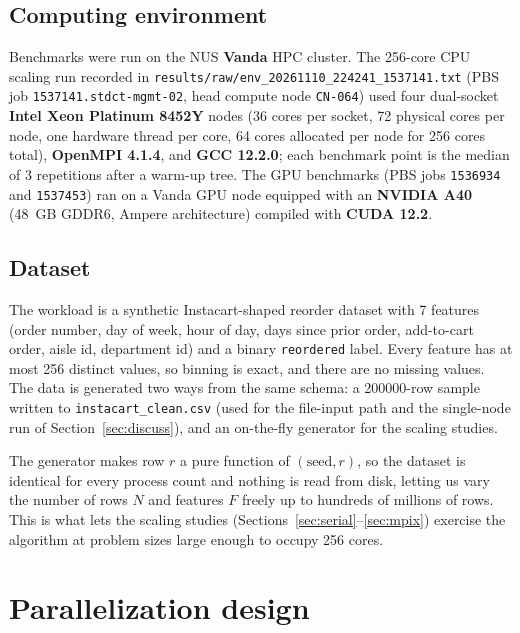 \documentclass[11pt]{article}
\begin{document}
\subsection{Computing environment}

Benchmarks were run on the NUS \textbf{Vanda} HPC cluster. The \num{256}-core CPU scaling run recorded in \texttt{results/raw/env\_20261110\_224241\_1537141.txt} (PBS job \texttt{1537141.stdct-mgmt-02}, head compute node \texttt{CN-064}) used four dual-socket \textbf{Intel Xeon Platinum 8452Y} nodes (\num{36} cores per socket, \num{72} physical cores per node, one hardware thread per core, \num{64} cores allocated per node for \num{256} cores total), \textbf{OpenMPI 4.1.4}, and \textbf{GCC 12.2.0}; each benchmark point is the median of \num{3} repetitions after a warm-up tree. The GPU benchmarks (PBS jobs \texttt{1536934} and \texttt{1537453}) ran on a Vanda GPU node equipped with an \textbf{NVIDIA A40} (\SI{48}{GB} GDDR6, Ampere architecture) compiled with \textbf{CUDA 12.2}.

\subsection{Dataset}

The workload is a synthetic Instacart-shaped reorder dataset with \num{7} features (order number, day of week, hour of day, days since prior order, add-to-cart order, aisle id, department id) and a binary \texttt{reordered} label. Every feature has at most \num{256} distinct values, so binning is exact, and there are no missing values. The data is generated two ways from the same schema: a \num{200000}-row sample written to \texttt{instacart\_clean.csv} (used for the file-input path and the single-node run of Section~\ref{sec:discuss}), and an on-the-fly generator for the scaling studies.

The generator makes row $r$ a pure function of $(\text{seed},r)$, so the dataset is identical for every process count and nothing is read from disk, letting us vary the number of rows $N$ and features $F$ freely up to hundreds of millions of rows. This is what lets the scaling studies (Sections~\ref{sec:serial}--\ref{sec:mpix}) exercise the algorithm at problem sizes large enough to occupy \num{256} cores.

\section{Parallelization design}\label{sec:design}
\end{document}
